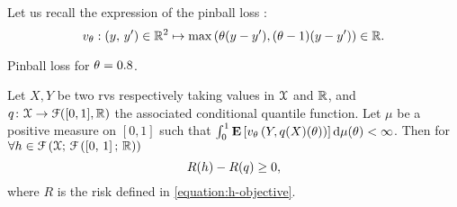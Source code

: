 Let us recall the expression of the pinball loss :
\begin{dmath}[compact]
    v_{\hyperparameter}: (y,\,y') \in
    \reals^2 \mapsto  \max{(\hyperparameter (y-y'), (\hyperparameter
    -1)(y-y'))} \in \reals.
\end{dmath}
\begin{floatingfigure}{.7\textwidth}
    \centering
    
    \caption{\label{figure:pinball} Pinball loss for $\theta=0.8$.}
\end{floatingfigure}
\begin{proposition}\label{proposition:generalized_excess_risk}
    Let $X,Y$ be two \acp{rv} respectively taking values in $\mathcal{X}$ and
    $\mathbb{R}$, and $q \colon \mathcal{X} \to \mathcal{F}([0,1],\mathbb{R})$ the
    associated conditional quantile function.  Let $\mu$ be a positive measure
    on $[0,1]$ such that $ \int_{0}^1 \mathbf{{E}}\left[
    v_{\theta}\left(Y,q(X)(\theta)\right)\right] \mathrm{d}
    \mu(\theta) < \infty$.  Then for $\forall h \in
    \mathcal{F}\left(\mathcal{X};\,\mathcal{F}\left(\left[0,\,1\right];\,\mathbb{R}\right)\right)$
    \begin{dmath*}
        \risk(h) - \risk(q) \geq 0,
    \end{dmath*}
    where $R$ is the risk defined in \cref{equation:h-objective}.
\end{proposition}

